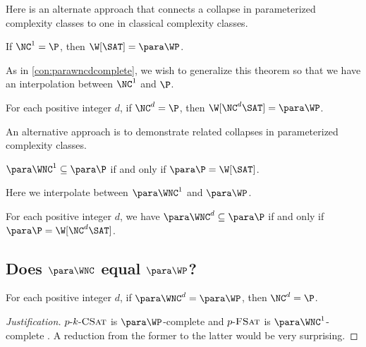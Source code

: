 \documentclass{article}
\newenvironment{justification}{\begin{proof}[Justification]}{\end{proof}}
\newcommand{\dash}{\textnormal{-}}
\begin{document}
Here is an alternate approach that connects a collapse in parameterized complexity classes to one in classical complexity classes.

\begin{theorem}
  If $\NC^1 = \P$, then $\W[\SAT] = \para \WP$.
\end{theorem}

As in \autoref{con:parawncdcomplete}, we wish to generalize this theorem so that we have an interpolation between $\NC^1$ and $\P$.

\begin{conjecture}
  For each positive integer $d$, if $\NC^d = \P$, then $\W[\NC^d \SAT] = \para \WP$.
\end{conjecture}

An alternative approach is to demonstrate related collapses in parameterized complexity classes.

\begin{theorem}
  $\para \WNC^1 \subseteq \para \P$ if and only if $\para \P = \W[\SAT]$.
\end{theorem}

Here we interpolate between $\para \WNC^1$ and $\para \WP$.

\begin{conjecture}
  For each positive integer $d$, we have $\para \WNC^d \subseteq \para \P$ if and only if $\para \P = \W[\NC^d \SAT]$.
\end{conjecture}

\subsection{Does \texorpdfstring{$\para \WNC$}{paraWNC} equal \texorpdfstring{$\para \WP$}{paraWP}?}
\label{sec:wncwp}

\begin{conjecture}
  For each positive integer $d$, if $\para \WNC^d = \para \WP$, then $\NC^d = \P$.
\end{conjecture}
\begin{justification}
  $p \dash k \dash \textsc{CSat}$ is $\para \WP$-complete and $p \dash \textsc{FSat}$ is $\para \WNC^1$-complete \autocite[Theorem~3.6]{est15}.
  A reduction from the former to the latter would be very surprising.
\end{justification}
\end{document}
